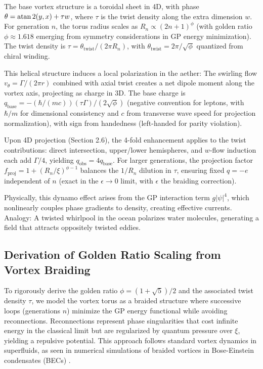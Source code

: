\documentclass{article}
\begin{document}
The base vortex structure is a toroidal sheet in 4D, with phase $\theta = \atan2(y, x) + \tau w$, where $\tau$ is the twist density along the extra dimension $w$. For generation $n$, the torus radius scales as $R_n \propto (2n+1)^\phi$ (with golden ratio $\phi \approx 1.618$ emerging from symmetry considerations in GP energy minimization). The twist density is $\tau = \theta_{\text{twist}} / (2\pi R_n)$, with $\theta_{\text{twist}} = 2\pi / \sqrt{\phi}$ quantized from chiral winding.

This helical structure induces a local polarization in the aether: The swirling flow $v_{\theta} = \Gamma / (2\pi r)$ combined with axial twist creates a net dipole moment along the vortex axis, projecting as charge in 3D. The base charge is $q_{\text{base}} = - (\hbar / (m c)) (\tau \Gamma) / (2 \sqrt{\phi})$ (negative convention for leptons, with $\hbar / m$ for dimensional consistency and $c$ from transverse wave speed for projection normalization), with sign from handedness (left-handed for parity violation).

Upon 4D projection (Section 2.6), the 4-fold enhancement applies to the twist contributions: direct intersection, upper/lower hemispheres, and $w$-flow induction each add $\Gamma/4$, yielding $q_{\text{obs}} = 4 q_{\text{base}}$. For larger generations, the projection factor $f_{\text{proj}} = 1 + (R_n / \xi)^{\phi - 1}$ balances the $1/R_n$ dilution in $\tau$, ensuring fixed $q = -e$ independent of $n$ (exact in the $\epsilon \to 0$ limit, with $\epsilon$ the braiding correction).

Physically, this dynamo effect arises from the GP interaction term $g |\psi|^4$, which nonlinearly couples phase gradients to density, creating effective currents. Analogy: A twisted whirlpool in the ocean polarizes water molecules, generating a field that attracts oppositely twisted eddies.

\subsection{Derivation of Golden Ratio Scaling from Vortex Braiding}

To rigorously derive the golden ratio $\phi = (1 + \sqrt{5})/2$ and the associated twist density $\tau$, we model the vortex torus as a braided structure where successive loops (generations $n$) minimize the GP energy functional while avoiding reconnections. Reconnections represent phase singularities that cost infinite energy in the classical limit but are regularized by quantum pressure over $\xi$, yielding a repulsive potential. This approach follows standard vortex dynamics in superfluids, as seen in numerical simulations of braided vortices in Bose-Einstein condensates (BECs) \cite{bewley2008characterization}.
\end{document}
